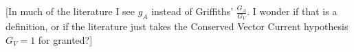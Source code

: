 [In much of the literature I see $g_A$ instead of Griffiths' $\frac{G_A}{G_V}$.  I wonder if that is a definition, or if the literature just takes the Conserved Vector Current hypothesis $G_V = 1$ for granted?]



